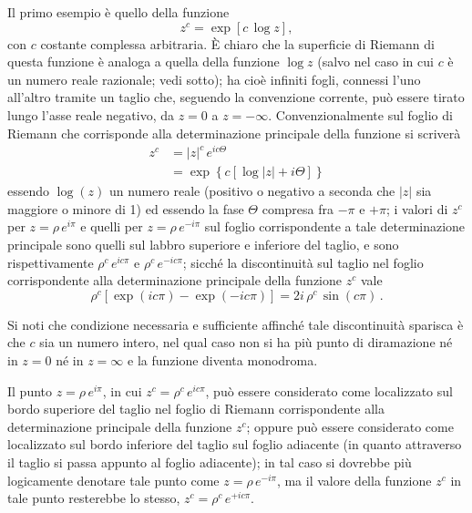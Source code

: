 \documentclass[11pt, a4paper]{book}
\numberwithin{equation}{section}
\begin{document}
Il primo esempio è quello della funzione
\begin{equation}
z^c = \exp\!\left[c\,\log z\right], \tag{10}
\end{equation}
con $c$ costante complessa arbitraria. È chiaro che la superficie di Riemann di questa funzione è analoga a quella della funzione $\log z$ (salvo nel caso in cui $c$ è un numero reale razionale; vedi sotto); ha cioè infiniti fogli, connessi l'uno all'altro tramite un taglio che, seguendo la convenzione corrente, può essere tirato lungo l'asse reale negativo, da $z=0$ a $z=-\infty$. Convenzionalmente sul foglio di Riemann che corrisponde alla determinazione principale della funzione si scriverà
\begin{align}
z^c &= |z|^c\,e^{ic\Theta} \tag{11a}\\
&= \exp\!\left\{c\left[\log|z| + i\Theta\right]\right\} \tag{11b}
\end{align}
essendo $\log(z)$ un numero reale (positivo o negativo a seconda che $|z|$ sia maggiore o minore di 1) ed essendo la fase $\Theta$ compresa fra $-\pi$ e $+\pi$; i valori di $z^c$ per $z = \rho\,e^{i\pi}$ e quelli per $z = \rho\,e^{-i\pi}$ sul foglio corrispondente a tale determinazione principale sono quelli sul labbro superiore e inferiore del taglio, e sono rispettivamente $\rho^c\,e^{ic\pi}$ e $\rho^c\,e^{-ic\pi}$; sicché la discontinuità sul taglio nel foglio corrispondente alla determinazione principale della funzione $z^c$ vale
\begin{equation}
\rho^c\!\left[\exp(ic\pi) - \exp(-ic\pi)\right] = 2i\,\rho^c\,\sin(c\pi)\,. \tag{12}
\end{equation}

Si noti che condizione necessaria e sufficiente affinché tale discontinuità sparisca è che $c$ sia un numero intero, nel qual caso non si ha più punto di diramazione né in $z=0$ né in $z=\infty$ e la funzione diventa monodroma.

Il punto $z = \rho\,e^{i\pi}$, in cui $z^c = \rho^c\,e^{ic\pi}$,%
può essere considerato come localizzato sul bordo superiore del taglio nel foglio di Riemann corrispondente alla determinazione principale della funzione $z^c$; oppure può essere considerato come localizzato sul bordo inferiore del taglio sul foglio adiacente (in quanto attraverso il taglio si passa appunto al foglio adiacente); in tal caso si dovrebbe più logicamente denotare tale punto come $z = \rho\,e^{-i\pi}$, ma il valore della funzione $z^c$ in tale punto resterebbe lo stesso, $z^c = \rho^c\,e^{+ic\pi}$.
\end{document}
